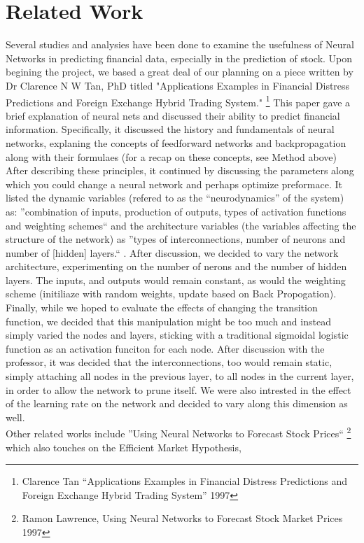 \documentclass[a4paper,11pt]{article}
\begin{document}
\section{Related Work}
Several studies and analysies have been done to examine the usefulness of Neural Networks in predicting financial data, especially in the prediction of stock. Upon begining the project, we based a great deal of our planning on a piece written by Dr Clarence N W Tan, PhD titled "Applications Examples in Financial Distress Predictions and Foreign Exchange Hybrid Trading System." \footnote{Clarence Tan ``Applications Examples in Financial Distress Predictions and Foreign Exchange Hybrid Trading System'' 1997} This paper gave a brief explanation of neural nets and discussed their ability to predict financial information. Specifically, it discussed the history and fundamentals of neural networks, explaning the concepts of feedforward networks and backpropagation along with their formulaes (for a recap on these concepts, see Method above) After describing these principles, it continued by discussing the parameters along which you could change a neural network and perhaps optimize preformace. It listed the dynamic 
variables (refered to as the ``neurodynamics'' of the system) as: ''combination of inputs, production of outputs, types of activation functions and weighting schemes`` and the architecture variables (the variables affecting the structure of the network) as ''types of interconnections, number of neurons and number of [hidden] layers.`` . After discussion, we decided to vary the network architecture, experimenting on the number of nerons and the number of hidden layers. The inputs, and outputs would remain constant, as would the weighting scheme (initiliaze with random weights, update based on Back Propogation). Finally, while we hoped to evaluate the effects of changing the transition function, we decided that this manipulation might be too much and instead simply varied the nodes and layers, sticking with a traditional sigmoidal logistic function as an activation funciton for each node. After discussion with the professor, it was decided that the interconnections, too would remain static, simply attaching 
all nodes in the previous layer, to all nodes in the current layer, in order to allow the network to prune itself. We were also intrested in the effect of the learning rate on the network and decided to vary along this dimension as well.\\
Other related works include ''Using Neural Networks to Forecast Stock Prices`` \footnote{Ramon Lawrence, Using Neural Networks to Forecast Stock Market Prices 1997} which also touches on the Efficient Market Hypothesis, 
\end{document}
